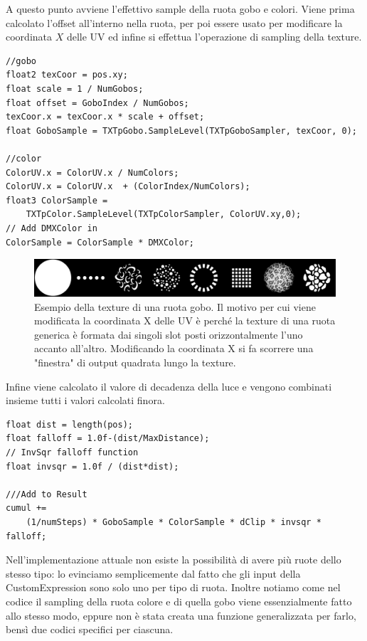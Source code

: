 \documentclass[main.tex]{subfiles}
\begin{document}
\noindent A questo punto avviene l'effettivo sample della ruota gobo e colori. Viene prima calcolato l'offset all'interno nella ruota, per poi essere usato per modificare la coordinata $X$ delle UV ed infine si effettua l'operazione di sampling della texture.
\clearpage
\begin{lstlisting}
//gobo
float2 texCoor = pos.xy;
float scale = 1 / NumGobos;
float offset = GoboIndex / NumGobos;
texCoor.x = texCoor.x * scale + offset;
float GoboSample = TXTpGobo.SampleLevel(TXTpGoboSampler, texCoor, 0);

//color
ColorUV.x = ColorUV.x / NumColors;
ColorUV.x = ColorUV.x  + (ColorIndex/NumColors);
float3 ColorSample =
    TXTpColor.SampleLevel(TXTpColorSampler, ColorUV.xy,0);
// Add DMXColor in
ColorSample = ColorSample * DMXColor;
\end{lstlisting}
\begin{figure}[H]
    \centering
    \includegraphics[width=1\linewidth]{img/renderingPipeline/Wheel_Rotating_Gobo_Wheel.jpg}
    \caption{Esempio della texture di una ruota gobo. Il motivo per cui viene modificata la coordinata X delle UV è perché la texture di una ruota generica è formata dai singoli slot posti orizzontalmente l'uno accanto all'altro. Modificando la coordinata X si fa scorrere una "finestra" di output quadrata lungo la texture.}
    \label{fig:2_goboWheel}
\end{figure}
Infine viene calcolato il valore di decadenza della luce e vengono combinati insieme tutti i valori calcolati finora.
\begin{lstlisting}
float dist = length(pos);
float falloff = 1.0f-(dist/MaxDistance);
// InvSqr falloff function
float invsqr = 1.0f / (dist*dist);

///Add to Result
cumul +=
    (1/numSteps) * GoboSample * ColorSample * dClip * invsqr * falloff;
\end{lstlisting}

Nell'implementazione attuale non esiste la possibilità di avere più ruote dello stesso tipo: lo evinciamo semplicemente dal fatto che gli input della CustomExpression sono solo uno per tipo di ruota. Inoltre notiamo come nel codice il sampling della ruota colore e di quella gobo viene essenzialmente fatto allo stesso modo, eppure non è stata creata una funzione generalizzata per farlo, bensì due codici specifici per ciascuna. 
\end{document}
